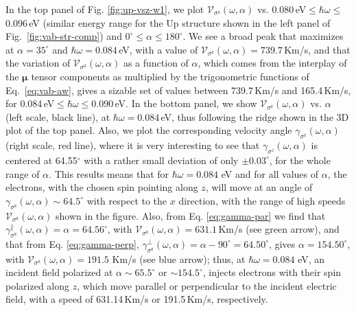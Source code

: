 \documentclass[floatfix,prb,aps,superscriptaddress,showpacs,11pt,preprint,letterpaper]{revtex4}
\begin{document}
In the top panel of Fig. \ref{fig:up-vsz-w1}, we plot
$\mathcal{V}_{\sigma^{\mathrm{z}}} (\omega,\alpha)$ vs.
0.080\,eV$\leq\hbar\omega\leq$0.096\,eV (similar energy range for the Up
structure shown in the left panel of Fig.~\ref{fig:vab-str-comp}) and
$0^\circ\leq\alpha\leq 180^\circ$. We see a broad peak that maximizes at
$\alpha=35^{\circ}$ and $\hbar\omega= 0.084$\,eV, with a value of
$\mathcal{V}_{\sigma^{\mathrm{z}}}(\omega,\alpha) = 739.7$\,Km/s, and that the
variation of $\mathcal{V}_{\sigma^{\mathrm{z}}} (\omega,\alpha)$ as a function
of $\alpha$, which comes from the interplay of the $\boldsymbol{\mu}$ tensor
components as multiplied by the  trigonometric functions of 
Eq.~\eqref{eq:vab-aw}, gives a sizable set of values between 739.7\,Km/s and 
165.4\,Km/s, for 0.084\,eV$\leq\hbar\omega\leq$0.090\,eV. In the bottom panel,
we show $\mathcal{V}_{\sigma^{\mathrm{z}}} (\omega,\alpha)$ vs. $\alpha$ (left
scale, black line), at $\hbar\omega= 0.084$\,eV, thus following the ridge shown
in the 3D plot of the top panel. Also, we plot the corresponding velocity angle
$\gamma_{\sigma^\mathrm{z}}(\omega,\alpha)$ (right scale, red line), where it is
very interesting to see that $\gamma_{\sigma^z}(\omega,\alpha)$ is centered at
64.55$^\circ$ with a rather small deviation of only $\pm 0.03^\circ$, for the
whole range of $\alpha$. This results means that for $\hbar\omega=0.084$ eV and
for all values of $\alpha$, the electrons, with the chosen spin pointing along
$z$, will move at an angle of $\gamma_{\sigma^\mathrm{z}}(\omega,\alpha) \sim
64.5^{\circ}$ with respect to the $x$ direction, with the range of  high speeds
$\mathcal{V}_{\sigma^{\mathrm{z}}} (\omega,\alpha)$ shown in the figure. Also,
from Eq. \eqref{eq:gamma-par} we find that $\gamma^\parallel_{\sigma^\mathrm{z}}
(\omega,\alpha)=\alpha = 64.56^\circ$, with $\mathcal{V}_{\sigma^{\mathrm{z}}}
(\omega,\alpha) = 631.1$\,Km/s (see green arrow), and that from Eq.
\eqref{eq:gamma-perp}, $\gamma^\perp_{\sigma^\mathrm{z}} (\omega,\alpha) =
\alpha-90^\circ=64.50^\circ$, gives $\alpha=154.50^\circ$, with
$\mathcal{V}_{\sigma^{\mathrm{z}}} (\omega,\alpha) = 191.5$ Km/s (see blue
arrow); thus, at $\hbar\omega=0.084$ eV, an incident field polarized at $\alpha
\sim 65.5^\circ$ or $\sim 154.5^\circ$, injects electrons with their spin
polarized along $z$, which move parallel or perpendicular to the incident
electric field,  with a speed of 631.14\,Km/s or 191.5\,Km/s, respectively.
\end{document}
